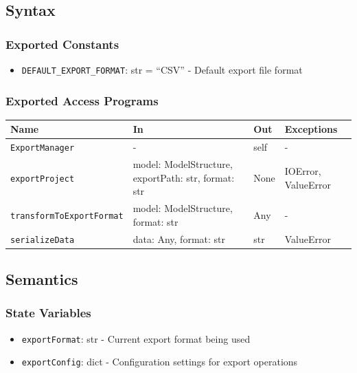 \documentclass[12pt, titlepage]{article}
\begin{document}
\subsection{Syntax}

\subsubsection{Exported Constants}

\begin{itemize}
\item \texttt{DEFAULT\_EXPORT\_FORMAT}: str = ``CSV'' - Default export file format
\end{itemize}

\subsubsection{Exported Access Programs}

\begin{center}
\renewcommand{\arraystretch}{1.55}
\begin{tabular}{p{6cm} p{5cm} p{2cm} p{3cm}}
\hline
\textbf{Name} & \textbf{In} & \textbf{Out} & \textbf{Exceptions} \\
\hline
\texttt{ExportManager} & - & self & - \\
\texttt{exportProject} & model: ModelStructure, \newline exportPath: str, \newline format: str & None &  IOError, \newline ValueError \\
\texttt{transformToExportFormat} & model: ModelStructure, \newline format: str & Any & - \\
\texttt{serializeData} & data: Any, \newline format: str & str & ValueError \\
\hline
\end{tabular}
\end{center}

\subsection{Semantics}

\subsubsection{State Variables}

\begin{itemize}
\item \texttt{exportFormat}: str - Current export format being used
\item \texttt{exportConfig}: dict - Configuration settings for export operations
\end{itemize}
\end{document}
